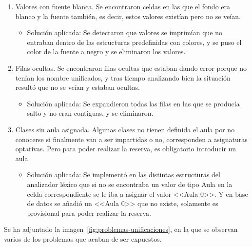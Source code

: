 \begin{enumerate}
	\begin{itemize}
		\item Solución aplicada: Unificar la abreviatura de las asignaturas en la hoja de Asignaturas, e ir actualizando en el horario del grado y semestre correspondiente.
	\end{itemize}
	\item Valores con fuente blanca. Se encontraron celdas en las que el fondo era blanco y la fuente también, es decir, estos valores existían pero no se veían.
	\begin{itemize}
		\item Solución aplicada: Se detectaron que valores se imprimían que no entraban dentro de las estructuras predefinidas con colores, y se puso el color de la fuente a negro y se eliminaron los valores.
	\end{itemize}
	\item Filas ocultas. Se encontraron filas ocultas que estaban dando error porque no tenían los nombre unificados, y tras tiempo analizando bien la situación resultó que no se veían y estaban ocultas.
	\begin{itemize}
		\item Solución aplicada: Se expandieron todas las filas en las que se producía salto y no eran contiguas, y se eliminaron.
	\end{itemize}
	\item Clases sin aula asignada. Algunas clases no tienen definida el aula por no conocerse si finalmente van a ser impartidas o no, corresponden a asignaturas optativas. Pero para poder realizar la reserva, es obligatorio introducir un aula.
	\begin{itemize}
		\item Solución aplicada: Se implementó en las distintas estructuras del analizador léxico que si no se encontraba un valor de tipo Aula en la celda correspondiente se le iba a asignar el valor <<Aula 0>>. Y en base de datos se añadió un <<Aula 0>> que no existe, solamente es provisional para poder realizar la reserva.
	\end{itemize}
\end{enumerate}

Se ha adjuntado la imagen~\ref{fig:problemas-unificaciones}, en la que se observan varios de los problemas que acaban de ser expuestos.



